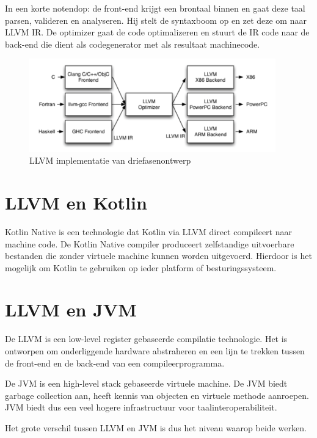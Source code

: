In een korte notendop: de front-end krijgt een brontaal binnen en gaat deze taal parsen, valideren en analyseren. Hij stelt de syntaxboom op en zet deze om naar LLVM IR. De optimizer gaat de code optimalizeren en stuurt de IR code naar de back-end die dient als codegenerator met als resultaat machinecode.

\begin{figure} [ht]
	\centering
	\includegraphics[width=0.95\textwidth]{img/llvmirdriefasen}
	\caption{LLVM implementatie van driefasenontwerp}
	\label{fig:llvmirdriefasen}
\end{figure}

\section{LLVM en Kotlin}
Kotlin Native is een technologie dat Kotlin via LLVM direct compileert naar machine code. De Kotlin Native compiler produceert zelfstandige uitvoerbare bestanden die zonder virtuele machine kunnen worden uitgevoerd. Hierdoor is het mogelijk om Kotlin te gebruiken op ieder platform of besturingssysteem.

\section{LLVM en JVM}
De LLVM is een low-level register gebaseerde compilatie technologie. Het is ontworpen om onderliggende hardware abstraheren en een lijn te trekken tussen de front-end en de back-end van een compileerprogramma.

De JVM is een high-level stack gebaseerde virtuele machine. De JVM biedt garbage collection aan, heeft kennis van objecten en virtuele methode aanroepen. JVM biedt dus een veel hogere infrastructuur voor taalinteroperabiliteit.

Het grote verschil tussen LLVM en JVM is dus het niveau waarop beide werken.
